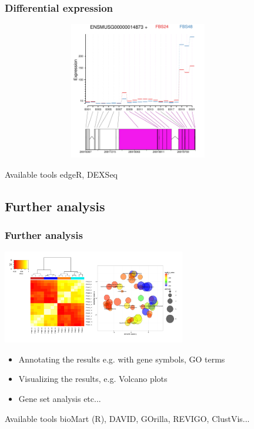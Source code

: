 \documentclass{beamer}\usepackage[]{graphicx}\usepackage[]{color}
\begin{document}
\begin{frame}
\frametitle{Differential expression}
\begin{center}
\includegraphics[width=12cm, height=6cm]{Images/DE_exon.pdf}
\end{center}
\begin{block}{Available tools}
edgeR, DEXSeq
\end{block}
\end{frame}

\subsection{Further analysis}
\begin{frame}
\frametitle{Further analysis}
\begin{center}
\includegraphics[width=8cm]{Images/DE_beyond.png}
\end{center}
\begin{itemize}
\item Annotating the results e.g. with gene symbols, GO terms
\item Visualizing the results, e.g. Volcano plots
\item Gene set analysis etc...
\end{itemize}
\begin{block}{Available tools}
bioMart (R), DAVID, GOrilla, REVIGO, ClustVis...
\end{block}
\end{frame}
\end{document}
